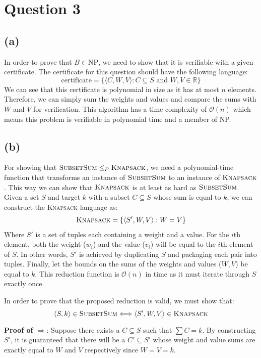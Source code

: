 \section{Question 3}
\subsection{(a)}
In order to prove that $B \in \text{NP}$, we need to show that it is verifiable with a given certificate.
The certificate for this question should have the following language:
\[\text{certificate}=\{\langle C, W, V \rangle : C \subseteq S \text{ and } W,V \in \mathbb{R}\}\]
We can see that this certificate is polynomial in size as it has at most $n$ elements. Therefore, we can simply sum the weights and values and compare the sums with $W$ and $V$ for verification. This algorithm has a time complexity of $\mathcal{O}(n)$ which means
this problem is verifiable in polynomial time and a member of NP.
\subsection{(b)}
For showing that $\textsc{SubsetSum} \leq_P \textsc{Knapsack}$, we need a polynomial-time function that transforms an instance of $\textsc{SubsetSum}$ to an instance of $\textsc{Knapsack}$.
This way we can show that $\textsc{Knapsack}$ is at least as hard as $\textsc{SubsetSum}$. Given a set $S$ and target $k$ with a subset $C \subseteq S$ whose sum is equal to $k$, we can construct the \textsc{Knapsack} language as:
\begin{equation}
    \begin{aligned}
        \textsc{Knapsack}=\{\langle S', W, V \rangle : W = V\}
    \end{aligned}
\end{equation}
Where $S'$ is a set of tuples each containing a weight and a value.
For the $i$th element, both the weight ($w_i$) and the value ($v_i$) will be equal to the $i$th element of $S$.
In other words, $S'$ is achieved by duplicating $S$ and packaging each pair into tuples.
Finally, let the bounds on the sums of the weights and values ($W, V$) be equal to $k$.
This reduction function is $\mathcal{O}(n)$ in time
as it must iterate through $S$ exactly once.

In order to prove that the proposed reduction is valid, we must show that:
\[\langle S, k \rangle \in \textsc{SubsetSum} \Longleftrightarrow \langle S', W, V \rangle \in \textsc{Knapsack}\]

\textbf{Proof of $\Rightarrow$}:
Suppose there exists a $C \subseteq S$ such that $\sum C = k$. By constructing $S'$, it is guaranteed that there will be a $C' \subseteq S'$ whose
weight and value sums are exactly equal to $W$ and $V$ respectively since $W = V = k$.

